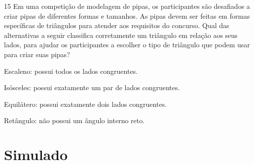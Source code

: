 \num{15} Em uma competição de modelagem de pipas, os participantes são
desafiados a criar pipas de diferentes formas e tamanhos. As pipas devem
ser feitas em formas específicas de triângulos para atender aos requisitos
do concurso. Qual das alternativas a seguir classifica corretamente um triângulo
em relação aos seus lados, para ajudar os participantes a escolher o tipo
de triângulo que podem usar para criar suas pipas?

\begin{escolha}
\item Escaleno: possui todos os lados congruentes.

\item Isósceles: possui exatamente um par de lados congruentes.

\item Equilátero: possui exatamente dois lados congruentes.

\item Retângulo: não possui um ângulo interno reto.
\end{escolha}



%




\chapter[Simulado 4]{Simulado}

